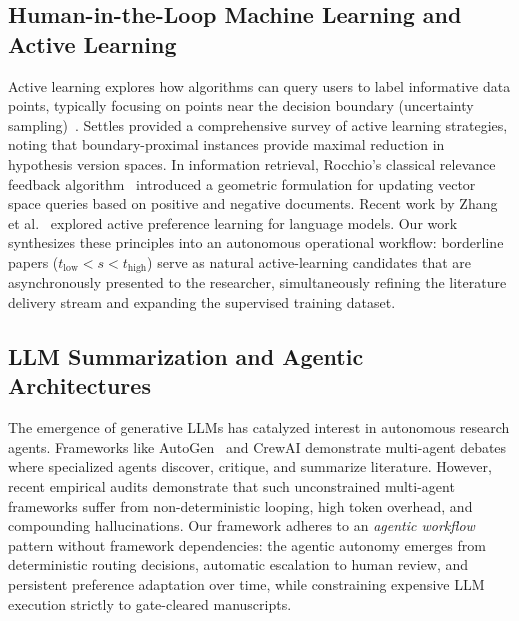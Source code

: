 \subsection{Human-in-the-Loop Machine Learning and Active Learning}
\label{sec:rel_hitl}

Active learning explores how algorithms can query users to label informative data points, typically focusing on points near the decision boundary (uncertainty sampling)~\cite{settles2012active,lewis1994sequential,anderson2021active}. Settles provided a comprehensive survey of active learning strategies, noting that boundary-proximal instances provide maximal reduction in hypothesis version spaces. In information retrieval, Rocchio's classical relevance feedback algorithm~\cite{rocchio1971relevance} introduced a geometric formulation for updating vector space queries based on positive and negative documents. Recent work by Zhang et al.~\cite{zhang2024active} explored active preference learning for language models. Our work synthesizes these principles into an autonomous operational workflow: borderline papers ($t_{\text{low}} < s < t_{\text{high}}$) serve as natural active-learning candidates that are asynchronously presented to the researcher, simultaneously refining the literature delivery stream and expanding the supervised training dataset.

\subsection{LLM Summarization and Agentic Architectures}
\label{sec:rel_llm_agents}

The emergence of generative LLMs has catalyzed interest in autonomous research agents. Frameworks like AutoGen~\cite{wu2023autogen} and CrewAI demonstrate multi-agent debates where specialized agents discover, critique, and summarize literature. However, recent empirical audits demonstrate that such unconstrained multi-agent frameworks suffer from non-deterministic looping, high token overhead, and compounding hallucinations. Our framework adheres to an \textit{agentic workflow} pattern without framework dependencies: the agentic autonomy emerges from deterministic routing decisions, automatic escalation to human review, and persistent preference adaptation over time, while constraining expensive LLM execution strictly to gate-cleared manuscripts.
